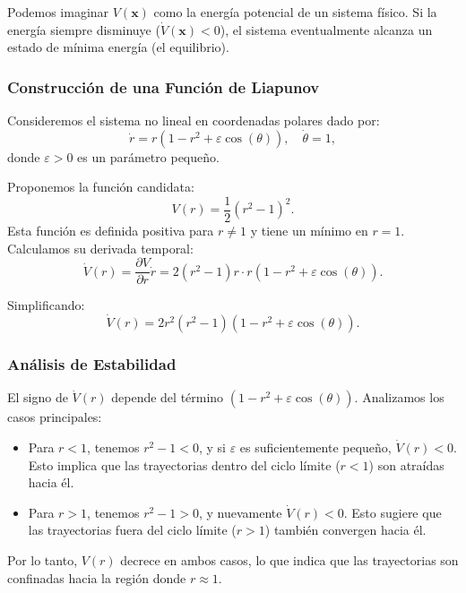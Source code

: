 Podemos imaginar $V(\mathbf{x})$ como la energía potencial de un sistema físico. Si la energía siempre disminuye ($\dot{V}(\mathbf{x}) < 0$), el sistema eventualmente alcanza un estado de mínima energía (el equilibrio).

\subsubsection{Construcción de una Función de Liapunov}
Consideremos el sistema no lineal en coordenadas polares dado por:
\[
\dot{r} = r(1 - r^2 + \varepsilon \cos(\theta)), \quad \dot{\theta} = 1,
\]
donde $\varepsilon > 0$ es un parámetro pequeño.

Proponemos la función candidata:
\[
V(r) = \frac{1}{2}(r^2 - 1)^2.
\]
Esta función es definida positiva para $r \neq 1$ y tiene un mínimo en $r = 1$. Calculamos su derivada temporal:
\[
\dot{V}(r) = \frac{\partial V}{\partial r} \dot{r} = 2(r^2 - 1)r \cdot r(1 - r^2 + \varepsilon \cos(\theta)).
\]

Simplificando:
\[
\dot{V}(r) = 2r^2(r^2 - 1)(1 - r^2 + \varepsilon \cos(\theta)).
\]

\subsubsection{Análisis de Estabilidad}
El signo de $\dot{V}(r)$ depende del término $(1 - r^2 + \varepsilon \cos(\theta))$. Analizamos los casos principales:
\begin{itemize}
    \item Para $r < 1$, tenemos $r^2 - 1 < 0$, y si $\varepsilon$ es suficientemente pequeño, $\dot{V}(r) < 0$. Esto implica que las trayectorias dentro del ciclo límite ($r < 1$) son atraídas hacia él.
    \item Para $r > 1$, tenemos $r^2 - 1 > 0$, y nuevamente $\dot{V}(r) < 0$. Esto sugiere que las trayectorias fuera del ciclo límite ($r > 1$) también convergen hacia él.
\end{itemize}

Por lo tanto, $V(r)$ decrece en ambos casos, lo que indica que las trayectorias son confinadas hacia la región donde $r \approx 1$.

